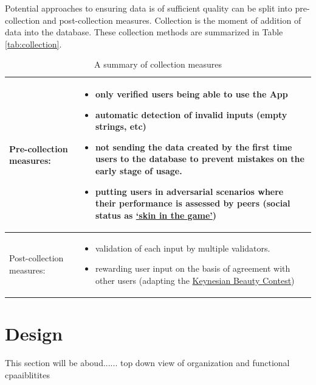 \documentclass{article}
\begin{document}
Potential approaches to ensuring data is of sufficient quality can be split into pre-collection and post-collection measures. Collection is the moment of addition of data into the database. These collection methods are summarized in Table \ref{tab:collection}.

  \begin{table}[h!]
      \centering
    \begin{tabular}{|l|p{4cm}|}
\toprule
Pre-collection measures:  & \begin{itemize}[left=0pt,topsep=0pt]\item only verified users being able to use the App
  \item automatic detection of invalid inputs (empty strings, etc)
  \item not sending the data created by the first time users to the database to prevent mistakes on the early stage of usage.
  \item putting users in adversarial scenarios where their performance is assessed by peers (social status as \href{https://dictionary.cambridge.org/dictionary/english/have-skin-in-the-game}{`skin in the game'})
\end{itemize} \\
\midrule
       Post-collection measures:  & \begin{itemize}[left=0pt,topsep=0pt]
  \item validation of each input by multiple validators.  
  \item rewarding user input on the basis of agreement with other users (adapting the \href{https://en.wikipedia.org/wiki/Keynesian_beauty_contest}{Keynesian Beauty Contest}\cite{Keynes1936})
\end{itemize} \\
\bottomrule
    \end{tabular}
    \caption{A summary of collection measures}

 \end{table}\label{tab:collection}

\newpage

\chapter{Design}
This section will be aboud...... top down view of organization and functional cpaaiblitites
\end{document}
